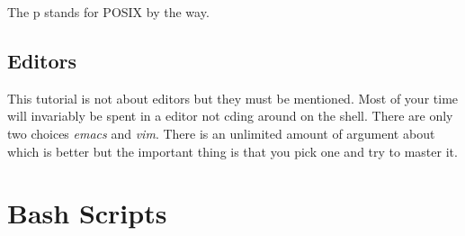 \documentclass[10pt]{article}
\begin{document}
  The p stands for POSIX by the way.

  
  \subsection{Editors}
  This tutorial is not about editors but they must be mentioned. Most of your time will invariably be spent in a editor not cding around on the shell. There are only two choices \textit{emacs} and \textit{vim}. There is an unlimited amount of argument about which is better but the important thing is that you pick one and try to master it.
  

  
\section{Bash Scripts}





\end{document}

